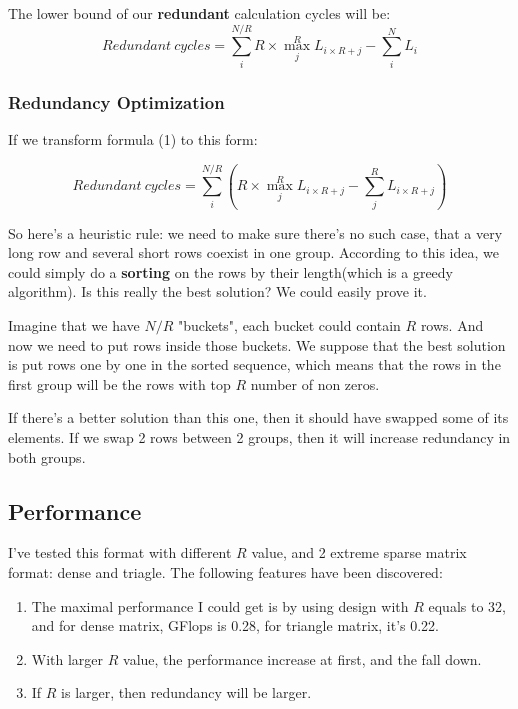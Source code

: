 \documentclass[a4paper, 10pt]{article}
\begin{document}
The lower bound of our \textbf{redundant} calculation cycles will be:
\begin{equation}
Redundant\ cycles = \sum_{i}^{N/R} R \times \max_{j}^{R} L_{i\times R + j} - \sum_{i}^{N} L_i
\end{equation}

\subsubsection{Redundancy Optimization}

If we transform formula (1) to this form:

\begin{equation}
Redundant\ cycles = \sum_{i}^{N/R} (R \times \max_{j}^{R} L_{i\times R + j} - \sum_{j}^{R} L_{i \times R + j})
\end{equation}

So here's a heuristic rule: we need to make sure there's no such case, that a very long row and several short rows coexist in one group. According to this idea, we could simply do a \textbf{sorting} on the rows by their length(which is a greedy algorithm). Is this really the best solution? We could easily prove it. 

Imagine that we have $N/R$ "buckets", each bucket could contain $R$ rows. And now we need to put rows inside those buckets. We suppose that the best solution is put rows one by one in the sorted sequence, which means that the rows in the first group will be the rows with top $R$ number of non zeros.

If there's a better solution than this one, then it should have swapped some of its elements. If we swap 2 rows between 2 groups, then it will increase redundancy in both groups.

\subsection{Performance}

I've tested this format with different $R$ value, and 2 extreme sparse matrix format: dense and triagle. The following features have been discovered:
\begin{enumerate}
\item The maximal performance I could get is by using design with $R$ equals to 32, and for dense matrix, GFlops is 0.28, for triangle matrix, it's 0.22.
\item With larger $R$ value, the performance increase at first, and the fall down.
\item If $R$ is larger, then redundancy will be larger.
\end{enumerate}
\end{document}
